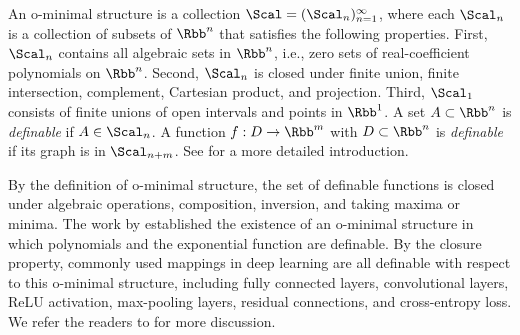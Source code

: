 An o-minimal structure is a collection $\Scal = (\Scal_n)_{n=1}^\infty$, where each $\Scal_n$ is a collection of subsets of $\Rbb^n$ that satisfies the following properties. First, $\Scal_n$ contains all algebraic sets in $\Rbb^n$, i.e., zero sets of real-coefficient polynomials on $\Rbb^n$. Second, $\Scal_n$ is closed under finite union, finite intersection, complement, Cartesian product, and projection. Third, $\Scal_1$ consists of finite unions of open intervals and points in $\Rbb^1$. A set $A \subset \Rbb^n$ is {\it definable} if $A \in \Scal_n$. A function $f: D \to \Rbb^m$ with $D \subset \Rbb^n$ is {\it definable} if its graph is in $\Scal_{n+m}$. See  for a more detailed introduction.

By the definition of o-minimal structure, the set of definable functions is closed under algebraic operations, composition, inversion, and taking maxima or minima. 
The work by \citet{wilkie1996model} established the existence of an o-minimal structure in which polynomials and the exponential function are definable. 
By the closure property, commonly used mappings in deep learning are all definable with respect to this o-minimal structure, including fully connected layers, convolutional layers, ReLU activation, max-pooling layers, residual connections, and cross-entropy loss. We refer the readers to \citet{ji2020directional} for more discussion. 



